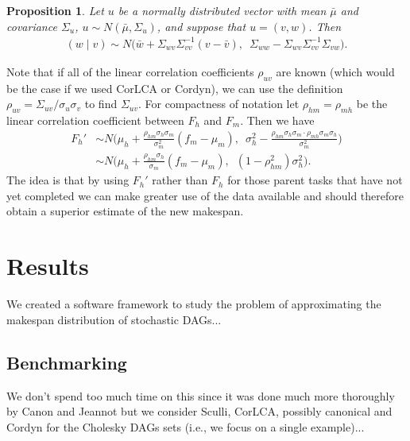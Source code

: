 \documentclass[12pt]{article}
\newtheorem{prop}[theorem]{Proposition}
\begin{document}
\begin{prop}
	Let $u$ be a normally distributed vector with mean $\bar{\mu}$ and covariance $\Sigma_u$, $u \sim N(\bar{\mu}, \Sigma_u)$, and suppose that $u = (v, w)$. Then 
	\begin{align*}
	(w \mid v) \sim N \big( \bar{w} + \Sigma_{wv}\Sigma_{vv}^{-1} (v - \bar{v}), \enspace  \Sigma_{ww} - \Sigma_{wv} \Sigma_{vv}^{-1} \Sigma_{vw} \big).
	\end{align*}
\end{prop}
Note that if all of the linear correlation coefficients $\rho_{uv}$ are known (which would be the case if we used CorLCA or Cordyn), we can use the definition $\rho_{uv} = \Sigma_{uv} / \sigma_u \sigma_v$ to find $\Sigma_{uv}$. For compactness of notation let $\rho_{hm} = \rho_{mh}$ be the linear correlation coefficient between $F_h$ and $F_m$. Then we have 
\begin{align*}
F_h' &\sim N \bigg( \mu_{h} + \frac{\rho_{hm} \sigma_{h} \sigma_{m}}{\sigma_{m}^2} (f_m - \mu_{m}), \enspace \sigma_{h}^2 - \frac{\rho_{hm} \sigma_{h} \sigma_{m} \cdot \rho_{mh} \sigma_{m} \sigma_{h}}{\sigma_{m}^2} \bigg) \nonumber\\
&\sim N \bigg(\mu_{h} + \frac{\rho_{hm} \sigma_{h}}{\sigma_{m}} (f_m - \mu_{m}), \enspace (1 - \rho_{hm}^2) \sigma_{h}^2 \bigg).
\end{align*} 
The idea is that by using $F_h'$ rather than $F_h$ for those parent tasks that have not yet completed we can make greater use of the data available and should therefore obtain a superior estimate of the new makespan.  


\section{Results}
\label{sect.results}


We created a software framework to study the problem of approximating the makespan distribution of stochastic DAGs...

\subsection{Benchmarking}
\label{subsect.benchmarking}

We don't spend too much time on this since it was done much more thoroughly by Canon and Jeannot but we consider Sculli, CorLCA, possibly canonical and Cordyn for the Cholesky DAGs sets (i.e., we focus on a single example)...
\end{document}
